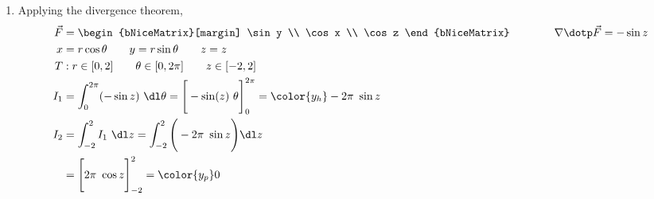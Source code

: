 \begin{enumerate}
    \item Applying the divergence theorem,
          \begin{align}
              \vec{F} & = \begin{bNiceMatrix}[margin]
                              \sin y \\ \cos x \\ \cos z
                          \end{bNiceMatrix} \qquad\qquad
              \nabla \dotp \vec{F} = -\sin z                       \\
              x       & = r\cos \theta \qquad y = r\sin \theta
              \qquad z = z                                         \\
              T       & : r \in [0, 2] \qquad \theta \in [0, 2\pi]
              \qquad z \in [-2, 2]                                 \\
              I_1     & = \int_{0}^{2\pi} (-\sin z) \ \dl \theta
              = \Bigg[ -\sin(z)\ \theta \Bigg]_{0}^{2\pi}
              = {\color{y_h} -2\pi\ \sin z}                        \\
              I_2     & = \int_{-2}^{2} I_1 \ \dl z
              = \int_{-2}^{2} \Bigg( -2\pi\ \sin z \Bigg) \dl z    \\
                      & = \Bigg[ 2\pi\ \cos z \Bigg]_{-2}^{2}
              = {\color{y_p} 0 }                                   \\
          \end{align}


\end{enumerate}
